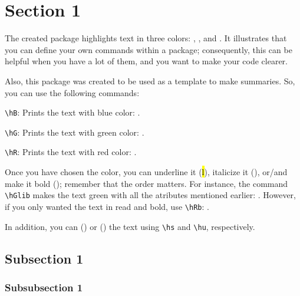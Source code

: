 
\section{Section 1}

  The created package highlights text in three colors: , , and .  It illustrates that you can define your own commands within a package; consequently, this can be helpful when you have a lot of them, and you want to make your code clearer.

  Also, this package was created to be used as a template to make summaries.  So, you can use the following commands:

  \begin{li}
    \item \verb=\hB=: Prints the text with blue  color: .
    \item \verb=\hG=: Prints the text with green color: .
    \item \verb=\hR=: Prints the text with red   color: .
  \end{li}

  Once you have chosen the color, you can underline it (\hl{l}), italicize it (), or/and make it bold (); remember that the order matters.  For instance, the command \verb=\hGlib= makes the text green with all the atributes mentioned earlier: .  However, if you only wanted the text in read and bold, use \verb=\hRb=: .

  In addition, you can () or () the text using \verb=\hs= and \verb=\hu=, respectively.

  \subsection{Subsection 1}

    \lipsum

    \subsubsection{Subsubsection 1}

      \lipsum
      \lipsum[1-2]
      \pagebreak
